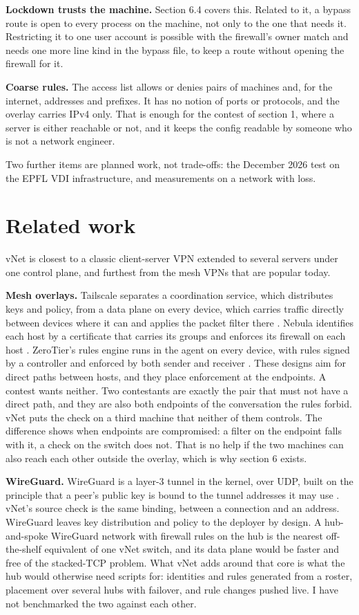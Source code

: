 \documentclass[11pt,a4paper]{article}
\begin{document}
\textbf{Lockdown trusts the machine.} Section 6.4 covers this. Related to it, a bypass route is open to every process on the machine, not only to the one that needs it. Restricting it to one user account is possible with the firewall's owner match and needs one more line kind in the bypass file, to keep a route without opening the firewall for it.

\textbf{Coarse rules.} The access list allows or denies pairs of machines and, for the internet, addresses and prefixes. It has no notion of ports or protocols, and the overlay carries IPv4 only. That is enough for the contest of section 1, where a server is either reachable or not, and it keeps the config readable by someone who is not a network engineer.

Two further items are planned work, not trade-offs: the December 2026 test on the EPFL VDI infrastructure, and measurements on a network with loss.

\hypertarget{related-work}{%
\section{Related work}\label{related-work}}

vNet is closest to a classic client-server VPN extended to several servers under one control plane, and furthest from the mesh VPNs that are popular today.

\textbf{Mesh overlays.} Tailscale separates a coordination service, which distributes keys and policy, from a data plane on every device, which carries traffic directly between devices where it can and applies the packet filter there \cite{ref2}. Nebula identifies each host by a certificate that carries its groups and enforces its firewall on each host \cite{ref3}. ZeroTier's rules engine runs in the agent on every device, with rules signed by a controller and enforced by both sender and receiver \cite{ref4}. These designs aim for direct paths between hosts, and they place enforcement at the endpoints. A contest wants neither. Two contestants are exactly the pair that must not have a direct path, and they are also both endpoints of the conversation the rules forbid. vNet puts the check on a third machine that neither of them controls. The difference shows when endpoints are compromised: a filter on the endpoint falls with it, a check on the switch does not. That is no help if the two machines can also reach each other outside the overlay, which is why section 6 exists.

\textbf{WireGuard.} WireGuard is a layer-3 tunnel in the kernel, over UDP, built on the principle that a peer's public key is bound to the tunnel addresses it may use \cite{ref1}. vNet's source check is the same binding, between a connection and an address. WireGuard leaves key distribution and policy to the deployer by design. A hub-and-spoke WireGuard network with firewall rules on the hub is the nearest off-the-shelf equivalent of one vNet switch, and its data plane would be faster and free of the stacked-TCP problem. What vNet adds around that core is what the hub would otherwise need scripts for: identities and rules generated from a roster, placement over several hubs with failover, and rule changes pushed live. I have not benchmarked the two against each other.
\end{document}
